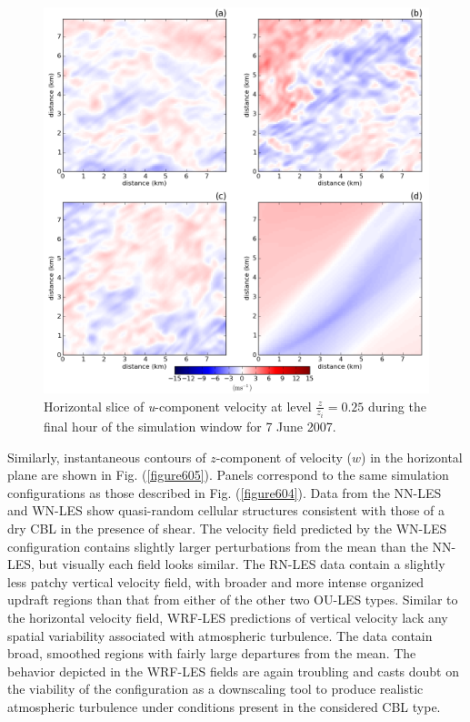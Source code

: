 \begin{figure}[H]
\begin{center}
\includegraphics[width=\textwidth]{figures/chapter6/u_slice_20070607}
\end{center}
\caption{Horizontal slice of \textit{u}-component velocity at level $\frac{z}{z_i} = 0.25$ during the final hour of the simulation window for 7 June 2007.}
\label{figure604}
\end{figure}


Similarly, instantaneous contours of $z$-component of velocity ($w$) in the horizontal plane are shown in Fig. (\autoref{figure605}). Panels correspond to the same simulation configurations as those described in Fig. (\autoref{figure604}). Data from the NN-LES and WN-LES show quasi-random cellular structures consistent with those of a dry CBL in the presence of shear. The velocity field predicted by the WN-LES configuration contains slightly larger perturbations from the mean than the NN-LES, but visually each field looks similar. The RN-LES data contain a slightly less patchy vertical velocity field, with broader and more intense organized updraft regions than that from either of the other two OU-LES types. Similar to the horizontal velocity field, WRF-LES predictions of vertical velocity lack any spatial variability associated with atmospheric turbulence. The data contain broad, smoothed regions with fairly large departures from the mean. The behavior depicted in the WRF-LES fields are again troubling and casts doubt on the viability of the configuration as a downscaling tool to produce realistic atmospheric turbulence under conditions present in the considered CBL type.


